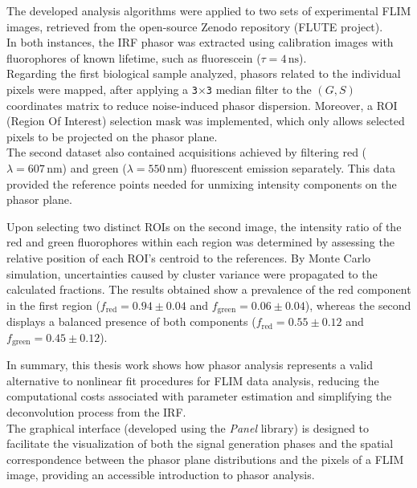\documentclass[a4paper, 11pt]{article}
\begin{document}
The developed analysis algorithms were applied to two sets of experimental FLIM images, retrieved from the open-source Zenodo repository (FLUTE project).\\
In both instances, the IRF phasor was extracted using calibration images with fluorophores of known lifetime, such as fluorescein ($\tau = 4\,\text{ns}$).\\
Regarding the first biological sample analyzed, phasors related to the individual pixels were mapped, after applying a \texttt{3}$\times$\texttt{3} median filter to the $(G, S)$ coordinates matrix to reduce noise-induced phasor dispersion.
Moreover, a ROI (Region Of Interest) selection mask was implemented, which only allows selected pixels to be projected on the phasor plane.\\
The second dataset also contained acquisitions achieved by filtering red ($\lambda = 607\,\text{nm}$) and green ($\lambda = 550\,\text{nm}$) fluorescent emission separately. This data provided the reference points needed for unmixing intensity components on the phasor plane.

Upon selecting two distinct ROIs on the second image, the intensity ratio of the red and green fluorophores within each region was determined by assessing the relative position of each ROI's centroid to the references. By Monte Carlo simulation, uncertainties caused by cluster variance were propagated to the calculated fractions. The results obtained show a prevalence of the red component in the first region ($f_{\text{red}} = 0.94 \pm 0.04$ and $f_{\text{green}} = 0.06 \pm 0.04$), whereas the second displays a balanced presence of both components ($f_{\text{red}} = 0.55 \pm 0.12$ and $f_{\text{green}} = 0.45 \pm 0.12$).

In summary, this thesis work shows how phasor analysis represents a valid alternative to nonlinear fit procedures for FLIM data analysis, reducing the computational costs associated with parameter estimation and simplifying the deconvolution process from the IRF.\\
The graphical interface (developed using the \textit{Panel} library) is designed to facilitate the visualization of both the signal generation phases and the spatial correspondence between the phasor plane distributions and the pixels of a FLIM image, providing an accessible introduction to phasor analysis.
\end{document}
